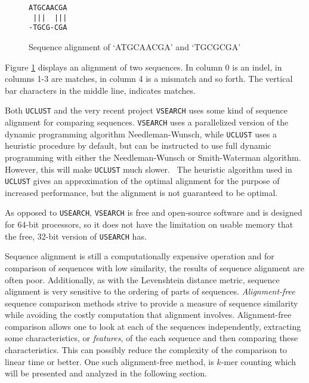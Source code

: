 \begin{figure}[H]
  \centering
  \verb+ATGCAACGA+ \\
  \verb+ |||  |||+ \\
  \verb+-TGCG-CGA+
  \caption{Sequence alignment of `ATGCAACGA' and `TGCGCGA'}
  \label{fig:seq_alignment}
\end{figure}

Figure \ref{fig:seq_alignment} displays an alignment of two sequences. In
column 0 is an indel, in columns 1-3 are matches, in column 4 is a mismatch and
so forth. The vertical bar characters in the middle line, indicates matches.

%

Both \texttt{UCLUST} and the very recent project \texttt{VSEARCH} uses some
kind of sequence alignment for comparing sequences. \texttt{VSEARCH} uses a
parallelized version of the dynamic programming algorithm Needleman-Wunsch,
while \texttt{UCLUST} uses a heuristic procedure by default, but can be
instructed to use full dynamic programming with either the Needleman-Wunsch or
Smith-Waterman algorithm. However, this will make \texttt{UCLUST} much
slower.~\cite{vsearch} The heuristic algorithm used in \texttt{UCLUST} gives an
approximation of the optimal alignment for the purpose of increased
performance, but the alignment is not guaranteed to be optimal.

As opposed to \texttt{USEARCH}, \texttt{VSEARCH} is free and open-source
software and is designed for 64-bit processors, so it does not have the
limitation on usable memory that the free, 32-bit version of \texttt{USEARCH}
has.

Sequence alignment is still a computationally expensive operation and for
comparison of sequences with low similarity, the results of sequence alignment
are often poor. Additionally, as with the Levenshtein distance metric, sequence
alignment is very sensitive to the ordering of parts of sequences.
\emph{Alignment-free} sequence comparison methods strive to provide a measure
of sequence similarity while avoiding the costly computation that alignment
involves. Alignment-free comparison allows one to look at each of the sequences
independently, extracting some characteristics, or \emph{features}, of the each
sequence and then comparing these characteristics.  This can possibly reduce
the complexity of the comparison to linear time or better. One such
alignment-free method, is $k$-mer counting which will be presented and analyzed
in the following section.


